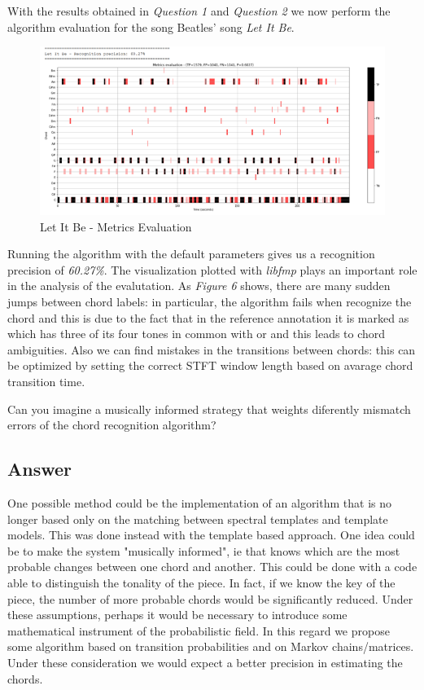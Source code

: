 \documentclass[
	12pt, %
]{fphw}
\begin{document}
{With the results obtained in \emph{Question 1} and \emph{Question 2} we now perform the algorithm evaluation for the song Beatles' song \emph{Let It Be}.

\begin{figure}[H]
 \centering
 \includegraphics[scale=1]{./images/3_let_it_be_metrics.png}
 \caption{Let It Be - Metrics Evaluation}
\end{figure}

Running the algorithm with the default parameters gives us a recognition precision of \emph{60.27\%}. The visualization plotted with \emph{libfmp} plays an important role in the analysis of the evalutation. As \emph{Figure 6} shows, there are many sudden jumps between chord labels: in particular, the algorithm fails when recognize the  chord and this is due to the fact that in the reference annotation it is marked as  which has three of its four tones in common with  or  and this leads to chord ambiguities. Also we can find mistakes in the transitions between chords: this can be optimized by setting the correct STFT window length based on avarage chord transition time.

\begin{problem}
	Can you imagine a musically informed strategy that weights diferently mismatch errors of
the chord recognition algorithm?
\end{problem}

\subsection*{\color{blue}Answer}

One possible method could be the implementation of an algorithm that is no longer based only on the matching between spectral templates and template models. 
This was done instead with the template based approach.
One idea could be to make the system "musically informed", ie that knows which are the most probable changes between one chord and another.
This could be done with a code able to distinguish the tonality of the piece. 
In fact, if we know the key of the piece, the number of more probable chords would be significantly reduced. Under these assumptions, perhaps it would be necessary to introduce some mathematical instrument of the probabilistic field. 
In this regard we propose some algorithm based on transition probabilities and on Markov chains/matrices. Under these consideration we would expect a better precision in estimating the chords.

}
\end{document}

